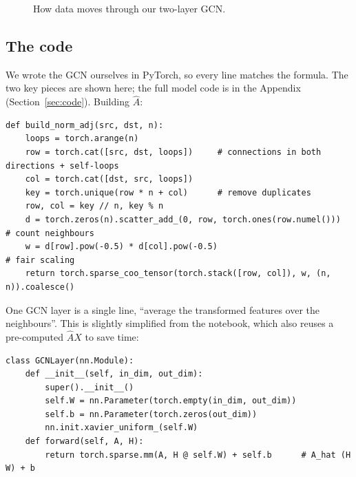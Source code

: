 \documentclass[11pt,a4paper]{article}
\newcommand{\Ahat}{\hat{A}}
\begin{document}
\begin{figure}[H]
\centering
{}
\caption{How data moves through our two-layer GCN.}
\label{fig:arch}
\end{figure}

\subsection{The code}
We wrote the GCN ourselves in PyTorch, so every line matches the formula. The two key pieces are shown here; the full model code is in the Appendix (Section~\ref{sec:code}). Building $\Ahat$:
\begin{lstlisting}
def build_norm_adj(src, dst, n):
    loops = torch.arange(n)
    row = torch.cat([src, dst, loops])     # connections in both directions + self-loops
    col = torch.cat([dst, src, loops])
    key = torch.unique(row * n + col)      # remove duplicates
    row, col = key // n, key % n
    d = torch.zeros(n).scatter_add_(0, row, torch.ones(row.numel()))   # count neighbours
    w = d[row].pow(-0.5) * d[col].pow(-0.5)                             # fair scaling
    return torch.sparse_coo_tensor(torch.stack([row, col]), w, (n, n)).coalesce()
\end{lstlisting}
One GCN layer is a single line, ``average the transformed features over the neighbours''. This is slightly simplified from the notebook, which also reuses a pre-computed $\Ahat X$ to save time:
\begin{lstlisting}
class GCNLayer(nn.Module):
    def __init__(self, in_dim, out_dim):
        super().__init__()
        self.W = nn.Parameter(torch.empty(in_dim, out_dim))
        self.b = nn.Parameter(torch.zeros(out_dim))
        nn.init.xavier_uniform_(self.W)
    def forward(self, A, H):
        return torch.sparse.mm(A, H @ self.W) + self.b      # A_hat (H W) + b
\end{lstlisting}
\end{document}
